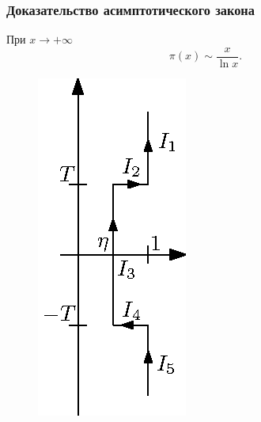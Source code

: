 \subsubsection{Доказательство асимптотического закона}

\begin{theorem}
При $x\to+\infty$ 
$$
	\pi(x)\sim \frac{x}{\ln{x}}.
$$
\end{theorem}
\begin{figure}
\begin{center}
\includegraphics[scale=1.0, trim=20 0 0 0]{05024}
\end{center}
\end{figure}
